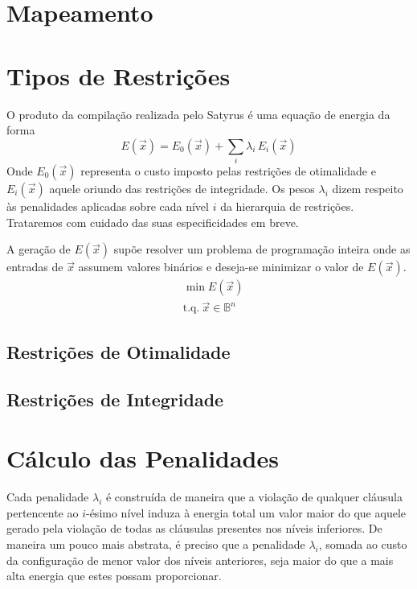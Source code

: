 \section{Mapeamento}

\section{Tipos de Restrições}

O produto da compilação realizada pelo Satyrus é uma equação de energia da forma
\begin{equation}
    E\left({\vec{x}}\right) = E_{0}\left({\vec{x}}\right) + \sum_{i} \lambda_{i}\, E_{i}\left({\vec{x}}\right) \label{eq:energy}
\end{equation}
Onde $E_0 (\vec{x})$ representa o custo imposto pelas restrições de otimalidade e $E_i \left(\vec{x}\right)$ aquele oriundo das restrições de integridade. Os pesos $\lambda_{i}$ dizem respeito às penalidades aplicadas sobre cada nível $i$ da hierarquia de restrições. Trataremos com cuidado das suas especificidades em breve.

A geração de $E\left(\vec{x}\right)$ supõe resolver um problema de programação inteira onde as entradas de $\vec{x}$ assumem valores binários e deseja-se minimizar o valor de $E(\vec{x})$.
\begin{align}
     & \min E(\vec{x})                            \\
     & \text{t.q.}~\vec{x} \in \mathbb{B}^{n} \nonumber
\end{align}


\subsection{Restrições de Otimalidade} \label{subsec:opt-cons}

\subsection{Restrições de Integridade} \label{subsec:int-cons}








\section{Cálculo das Penalidades}

Cada penalidade $\lambda_{i}$ é construída de maneira que a violação de qualquer cláusula pertencente ao $i$-ésimo nível induza à energia total um valor maior do que aquele gerado pela violação de todas as cláusulas presentes nos níveis inferiores. De maneira um pouco mais abstrata, é preciso que a penalidade $\lambda_{i}$, somada ao custo da configuração de menor valor dos níveis anteriores, seja maior do que a mais alta energia que estes possam proporcionar.

